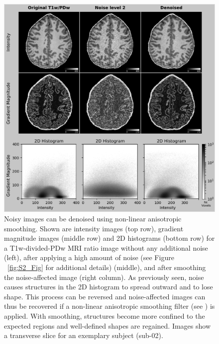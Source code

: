 \begin{figure}[htbp!]
\centering
\includegraphics[width=\textwidth]{figures/chapter_02_SI/supp_gramag_denoising_slices_and_histograms.png}
\caption{Noisy images can be denoised using non-linear anisotropic smoothing. Shown are intensity images (top row), gradient magnitude images (middle row) and 2D histograms (bottom row) for a T1w-divided-PDw MRI ratio image without any additional noise (left), after applying a high amount of noise (see Figure ~\ref{fig:S2_Fig} for additional details) (middle), and after smoothing the noise-affected image (right column). As previously seen, noise causes structures in the 2D histogram to spread outward and to lose shape. This process can be reversed and noise-affected images can thus be recovered if a non-linear anisotropic smoothing filter (see \parencite{Weickert1998}) is applied. With smoothing, structures become more confined to the expected regions and well-defined shapes are regained. Images show a transverse slice for an exemplary subject (sub-02).}
\label{fig:S3_Fig}
\end{figure}

